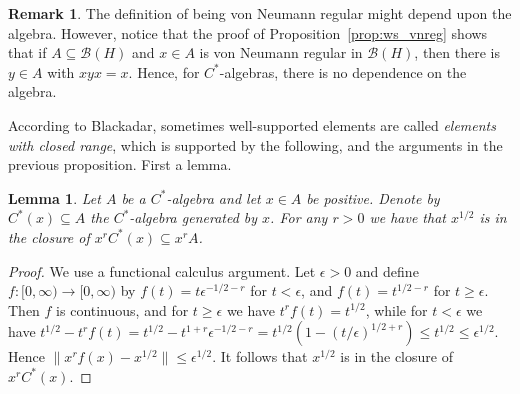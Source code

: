 \documentclass[twoside,a4paper,12pt]{article}
\theoremstyle{plain}
\newtheorem{lemma}[proposition]{Lemma}
\theoremstyle{definition}
\newtheorem{remark}[proposition]{Remark}
\newcommand{\mc}{\mathcal}
\begin{document}
\begin{remark}
The definition of being von Neumann regular might depend upon the algebra.  However, notice that the proof of Proposition~\ref{prop:ws_vnreg} shows that if $A\subseteq\mc B(H)$ and $x\in A$ is von Neumann regular in $\mc B(H)$, then there is $y\in A$ with $xyx=x$.  Hence, for $C^*$-algebras, there is no dependence on the algebra.
\end{remark}

According to Blackadar, sometimes well-supported elements are called \emph{elements with closed range}, which is supported by the following, and the arguments in the previous proposition.  First a lemma.

\begin{lemma}\label{lem:power_factorisation}
Let $A$ be a $C^*$-algebra and let $x\in A$ be positive.  Denote by $C^*(x) \subseteq A$ the $C^*$-algebra generated by $x$.  For any $r>0$ we have that $x^{1/2}$ is in the closure of $x^r C^*(x) \subseteq x^r A$.
\end{lemma}
\begin{proof}
We use a functional calculus argument.  Let $\epsilon>0$ and define $f\colon [0,\infty) \to [0,\infty)$ by $f(t) = t \epsilon^{-1/2-r}$ for $t<\epsilon$, and $f(t) = t^{1/2-r}$ for $t\geq\epsilon$.   Then $f$ is continuous, and for $t\geq\epsilon$ we have $t^r f(t) = t^{1/2}$, while for $t<\epsilon$ we have $t^{1/2} - t^r f(t) = t^{1/2} - t^{1+r} \epsilon^{-1/2-r} = t^{1/2}(1 - (t/\epsilon)^{1/2+r}) \leq t^{1/2} \leq \epsilon^{1/2}$.  Hence $\| x^r f(x) - x^{1/2} \| \leq \epsilon^{1/2}$.  It follows that $x^{1/2}$ is in the closure of $x^r C^*(x)$.
\end{proof}
\end{document}
